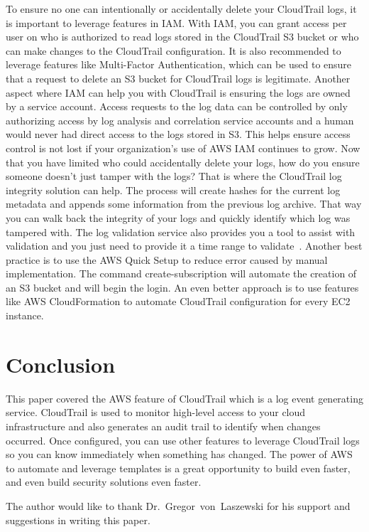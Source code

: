 To ensure no one can intentionally or accidentally delete your CloudTrail logs, it is important to leverage features in IAM. With IAM, you can grant access per user on who is authorized to read logs stored in the CloudTrail S3 bucket or who can make changes to the CloudTrail configuration. It is also recommended to leverage features like Multi-Factor Authentication, which can be used to ensure that a request to delete an S3 bucket for CloudTrail logs is legitimate. 
Another aspect where IAM can help you with CloudTrail is ensuring the logs are owned by a service account. Access requests to the log data can be controlled by only authorizing access by log analysis and correlation service accounts and a human would never had direct access to the logs stored in S3. This helps ensure access control is not lost if your organization’s use of AWS IAM continues to grow. 
Now that you have limited who could accidentally delete your logs, how do you ensure someone doesn’t just tamper with the logs? That is where the CloudTrail log integrity solution can help. The process will create hashes for the current log metadata and appends some information from the previous log archive. That way you can walk back the integrity of your logs and quickly identify which log was tampered with. The log validation service also provides you a tool to assist with validation and you just need to provide it a time range to validate~\cite{hid-sp18-518-CloudTrail-log-sharing}.
Another best practice is to use the AWS Quick Setup to reduce error caused by manual implementation. The command create-subscription will automate the creation of an S3 bucket and will begin the login. An even better approach is to use features like AWS CloudFormation to automate CloudTrail configuration for every EC2 instance.

\section{Conclusion}

This paper covered the AWS feature of CloudTrail which is a log event generating service. CloudTrail is used to monitor high-level access to your cloud infrastructure and also generates an audit trail to identify when changes occurred. Once configured, you can use other features to leverage CloudTrail logs so you can know immediately when something has changed. The power of AWS to automate and leverage templates is a great opportunity to build even faster, and even build security solutions even faster.

\begin{acks}

The author would like to thank Dr.~Gregor~von~Laszewski for his support and suggestions in writing this paper.

\end{acks}


 

